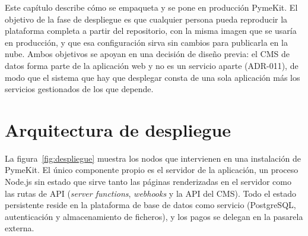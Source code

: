 
Este capítulo describe cómo se empaqueta y se pone en producción PymeKit. El
objetivo de la fase de despliegue es que cualquier persona pueda reproducir la
plataforma completa a partir del repositorio, con la misma imagen que se
usaría en producción, y que esa configuración sirva sin cambios para publicarla
en la nube. Ambos objetivos se apoyan en una decisión de diseño
previa: el CMS de datos forma parte de la aplicación web y no es un servicio
aparte (ADR-011), de modo que el sistema que hay que desplegar consta de una
sola aplicación más los servicios gestionados de los que depende.

\section{Arquitectura de despliegue}
\label{sec:despliegue-arquitectura}

La figura~\ref{fig:despliegue} muestra los nodos que intervienen en una
instalación de PymeKit. El único componente propio es el servidor de la
aplicación, un proceso Node.js sin estado que sirve tanto las páginas
renderizadas en el servidor como las rutas de API (\emph{server functions},
\emph{webhooks} y la API del CMS). Todo el estado persistente reside en la
plataforma de base de datos como servicio (PostgreSQL, autenticación y
almacenamiento de ficheros), y los pagos se delegan en la pasarela externa.

